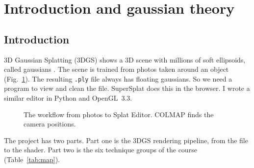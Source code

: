 \documentclass[9pt,twocolumn,a4paper]{extarticle}
\newcommand{\code}[1]{\texttt{#1}}
\begin{document}
\section{Introduction and gaussian theory}
\label{chap:theory}

\subsection{Introduction}
3D Gaussian Splatting (3DGS) shows a 3D scene with millions of soft ellipsoids, called gaussians \cite{kerbl2023gaussian}. The scene is trained from photos taken around an object (Fig.~\ref{fig:pipeline}). The resulting \code{.ply} file always has floating gaussians. So we need a program to view and clean the file. SuperSplat \cite{supersplat} does this in the browser. I wrote a similar editor in Python and OpenGL~3.3.

\begin{figure}[H]
\centering
{}
\caption{The workflow from photos to Splat Editor. COLMAP \cite{schonberger2016colmap} finds the camera positions.}
\label{fig:pipeline}
\end{figure}

The project has two parts. Part one is the 3DGS rendering pipeline, from the file to the shader. Part two is the six technique groups of the course (Table~\ref{tab:map}).
\end{document}
